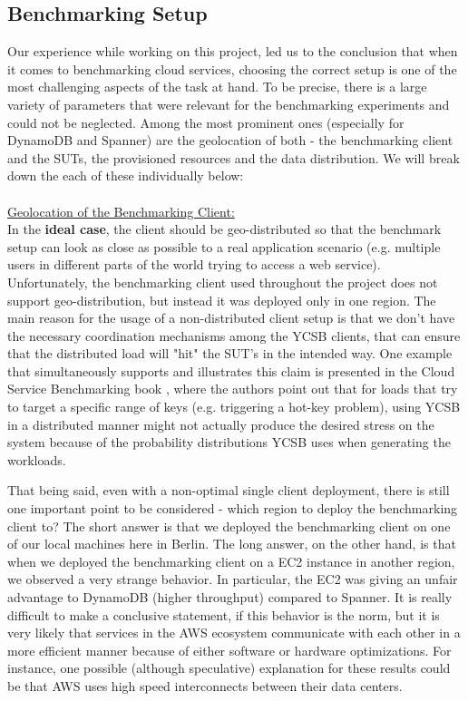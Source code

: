 \documentclass[letterpaper, 10 pt, conference]{ieeeconf}  %
\begin{document}
\subsection{Benchmarking Setup}
Our experience while working on this project, led us to the conclusion that when it comes to benchmarking cloud services, choosing the correct setup is one of the most challenging aspects of the task at hand. To be precise, there is a large variety of parameters that were relevant for the benchmarking experiments and could not be neglected. Among the most prominent ones (especially for DynamoDB and Spanner) are the geolocation of both - the benchmarking client and the SUTs, the provisioned resources and the data distribution. We will break down the each of these individually below:
\\
\\
\underline{Geolocation of the Benchmarking Client:}
\\
In the \textbf{ideal case}, the client should be geo-distributed so that the benchmark setup can look as close as possible to a real application scenario (e.g. multiple users in different parts of the world trying to access a web service). Unfortunately, the benchmarking client used throughout the project does not support geo-distribution, but instead it was deployed only in one region. The main reason for the usage of a non-distributed client setup is that we don't have the necessary coordination mechanisms among the YCSB clients, that can ensure that the distributed load will "hit" the SUT's in the intended way. One example that simultaneously supports and illustrates this claim is presented in the Cloud Service Benchmarking book \cite{StefanTaiBook}, where the authors point out that for loads that try to target a specific range of keys (e.g. triggering a hot-key problem), using YCSB in a distributed manner might not actually produce the desired stress on the system because of the probability distributions YCSB uses when generating the workloads. \par
That being said, even with a non-optimal single client deployment, there is still one important point to be considered - which region to deploy the benchmarking client to? The short answer is that we deployed the benchmarking client on one of our local machines here in Berlin. The long answer, on the other hand, is that when we deployed the benchmarking client on a EC2 instance in another region, we observed a very strange behavior. In particular, the EC2 was giving an unfair advantage to DynamoDB (higher throughput) compared to Spanner. It is really difficult to make a conclusive statement, if this behavior is the norm, but it is very likely that services in the AWS ecosystem communicate with each other in a more efficient manner because of either software or hardware optimizations. For instance, one possible (although speculative) explanation for these results could be that AWS uses high speed interconnects between their data centers. \par
\end{document}

